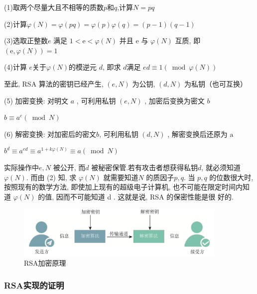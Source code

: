 \documentclass[12pt,hyperref,a4paper,UTF8]{ctexart}
\begin{document}
(1)取两个尽量大且不相等的质数$p$和$q$,计算$N=pq$\par
(2)计算$ \varphi\left(N\right)= \varphi\left(pq\right)=\varphi\left(p\right)\varphi\left(q\right)=(p-1)(q-1)$\par 
(3)选取正整数$ e$ 满足 $ 1<\mathrm{e}< \varphi\left(N\right)$  并且 $ \mathrm{e}$  与 $  \varphi\left(N\right)$  互质, 即 $ (\mathrm{e},  \varphi\left(N\right))=1 $\par 
(4)计算 $e$关于$  \varphi\left(N\right)  $的模逆元 $ d $, 即求 $ d  $满足 $ e d \equiv 1(\bmod \varphi\left(N\right))$\par 
至此, RSA 算法的密钥已经产生, $ (e, N) $ 为公钥, $ (d, N) $ 为私钥（也可互换）\par 
(5) 加密变换: 对明文 $ a$ , 可利用私钥  $(e,N)$ , 加密后变换为密文 $ b $\par 
\qquad $ b \equiv a^{e}(\bmod N) $\par 
(6) 解密变换: 对加密后的密文$b$, 可利用私钥 $ (d, N)$ , 解密变换后还原为  $\mathrm{a} $ \par 
\qquad $b^{d} \equiv a^{ed} \equiv a^{1+k \varphi\left(N\right)} \equiv a(\bmod N)$\par 

\vskip 5pt
实际操作中$e,N$  被公开, 而$d$  被秘密保管.若有攻击者想获得私钥$d$,  就必须知道 $ \varphi(N) $. 而由 (2) 知, 求 $ \varphi(N)$  就需要知道$  N $ 的质因子$  p, q $. 当 $ p, q $ 的位数很大时,  按照现有的数学方法, 即使加上现有的超级电子计算机, 也不可能在限定时间内知道 $ \varphi(N) $ 的值, 因而不可能知道  d . 这就是说, RSA 的保密性能是很 好的. \par
\quad  \par 
\vskip 3pt
\begin{figure}[!htbp]
    \centering
    \includegraphics[width =0.9\textwidth]{figures/RSA原理.png}
    \caption{RSA加密原理}
\end{figure}


\subsubsection{RSA实现的证明}
\end{document}
